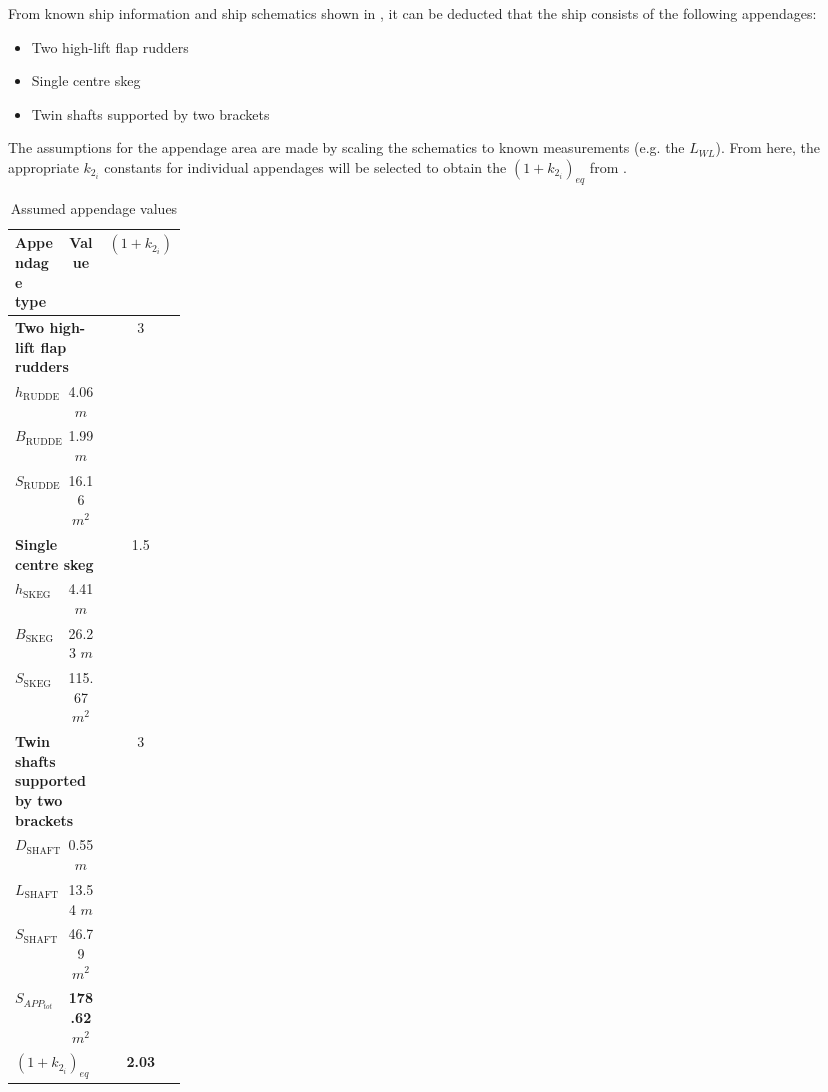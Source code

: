 From known ship information and ship schematics shown in , it can be deducted that the ship consists of the following appendages:

\begin{itemize}
    \setlength\itemsep{0em}
    \item Two high-lift flap rudders
    \item Single centre skeg
    \item Twin shafts supported by two brackets
\end{itemize}

The assumptions for the appendage area are made by scaling the schematics to known measurements (e.g. the $L_{WL}$). From here, the appropriate $k_{2_i}$ constants for individual appendages will be selected to obtain the $(1+k_{2_i})_{eq}$ from .

\begin{table}[ht]
    \footnotesize
    \centering
    {\begin{tabular}{ p{0.2\linewidth} c c}
    \hline
    Appendage type & Value & $(1+k_{2_i})$ \\
    \hline
    \multicolumn{2}{l}{\textbf{Two high-lift flap rudders}} & 3\\
    \hline
    $h_{\text{RUDDER}}$ & 4.06 $m$\\
    $B_{\text{RUDDER}}$ & 1.99 $m$\\
    $S_{\text{RUDDER}}$ & 16.16 $m^2$\\
    \hline
    \multicolumn{2}{l}{\textbf{Single centre skeg}} & 1.5\\
    \hline
    $h_{\text{SKEG}}$ & 4.41 $m$\\
    $B_{\text{SKEG}}$ & 26.23 $m$\\
    $S_{\text{SKEG}}$ & 115.67 $m^2$\\
    \hline
    \multicolumn{2}{l}{\textbf{Twin shafts supported by two brackets}} & 3\\
    \hline
    $D_{\text{SHAFT}}$ & 0.55 $m$\\
    $L_{\text{SHAFT}}$ & 13.54 $m$\\
    $S_{\text{SHAFT}}$ & 46.79 $m^2$\\
    \hline
    \multicolumn{1}{l}{\textbf{$S_{APP_{tot}}$}} & \textbf{178.62} $m^2$ \\
    \multicolumn{2}{l}{\textbf{$(1+k_{2_i})_{eq}$}} & \textbf{2.03} \\
    \end{tabular}}
\caption{Assumed appendage values}\label{tbl:assume_appendage_dimension}
\end{table}

